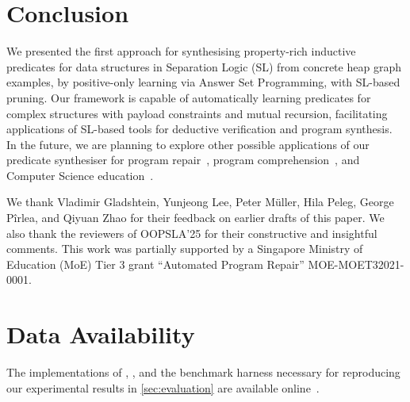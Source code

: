 
\section{Conclusion}
\label{sec:conclusion}

We presented the first approach for synthesising property-rich
inductive predicates for data structures in Separation Logic (SL) from
concrete heap graph examples, by positive-only learning via Answer Set
Programming, with SL-based pruning.
%
%
Our framework \tool is capable of automatically learning predicates
for complex structures with payload constraints and mutual recursion,
facilitating applications of SL-based tools for deductive verification
and program synthesis. 
%
In the future, we are planning to explore other possible applications
of our predicate synthesiser for program
repair~\cite{Tonder-LeGoues:ICSE18}, program
comprehension~\cite{DBLP:conf/iwpc/BoockmannL22}, and Computer Science
education~\cite{marron2012abstracting}.

\begin{acks}
  We thank Vladimir Gladshtein, Yunjeong Lee, Peter
  Müller, Hila Peleg, George Pîrlea, and Qiyuan Zhao for their feedback on
  earlier drafts of this paper.
%
  We also thank the reviewers of OOPSLA'25 for their constructive and
  insightful comments.
%
  This work was partially supported by a Singapore Ministry of
  Education (MoE) Tier 3 grant ``Automated Program Repair''
  MOE-MOET32021-0001.
\end{acks}



\section*{Data Availability}

The implementations of \tool, \ggen, and the benchmark harness
necessary for reproducing our experimental results in
\autoref{sec:evaluation} are available online~\cite{sippy-artefact}. 




